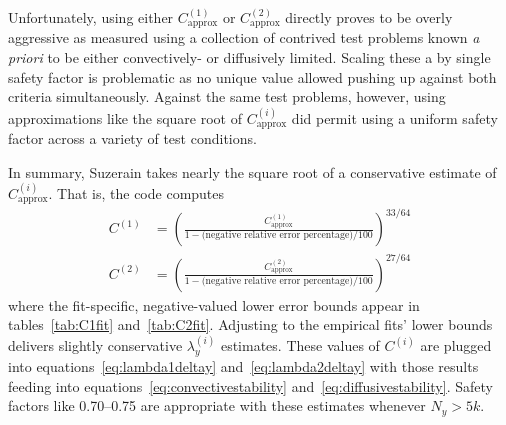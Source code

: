 \documentclass[letterpaper,11pt,nointlimits,reqno,draft]{amsbook}
\begin{document}
Unfortunately, using either $C_\text{approx}^{(1)}$ or $C_\text{approx}^{(2)}$
directly proves to be overly aggressive as measured using a collection of
contrived test problems known \emph{a priori} to be either convectively- or
diffusively limited.  Scaling these a by single safety factor is problematic as no
unique value allowed pushing up against both criteria simultaneously.  Against
the same test problems, however, using approximations like the square root of
$C_\text{approx}^{(i)}$ did permit using a uniform safety factor across a
variety of test conditions.

In summary, Suzerain takes nearly the square root of a conservative estimate of
$C_\text{approx}^{(i)}$.  That is, the code computes
\begin{align}
  C^{(1)} &= \left(
      \frac{C_\text{approx}^{(1)}}
           {1 - \text{(negative relative error percentage)}/100}
  \right)^{33/64}
\\
  C^{(2)} &= \left(
      \frac{C_\text{approx}^{(2)}}
           {1 - \text{(negative relative error percentage)}/100}
  \right)^{27/64}
\end{align}
where the fit-specific, negative-valued lower error bounds appear in
tables~\ref{tab:C1fit} and~\ref{tab:C2fit}.  Adjusting to the empirical fits'
lower bounds delivers slightly conservative $\lambda_y^{(i)}$ estimates.  These
values of $C^{(i)}$ are plugged into equations~\eqref{eq:lambda1deltay}
and~\eqref{eq:lambda2deltay} with those results feeding into
equations~\eqref{eq:convectivestability} and~\eqref{eq:diffusivestability}.
Safety factors like 0.70--0.75 are appropriate with these estimates whenever
$N_y > 5k$.
\end{document}
